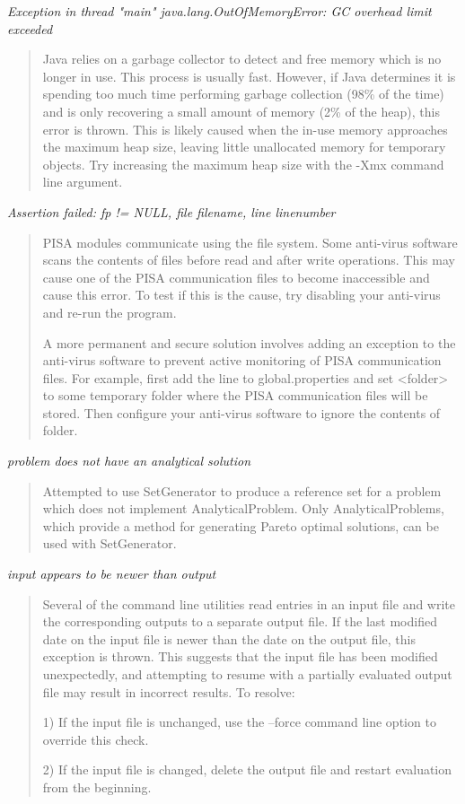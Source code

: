\noindent
\textit{Exception in thread "main" java.lang.OutOfMemoryError: GC overhead limit exceeded}
\begin{quote}
  Java relies on a garbage collector to detect and free memory which is no longer in use.  This process is usually fast.  However, if Java determines it is spending too much time performing garbage collection (98\% of the time) and is only recovering a small amount of memory (2\% of the heap), this error is thrown.  This is likely caused when the in-use memory approaches the maximum heap size, leaving little unallocated memory for temporary objects.  Try  increasing the maximum heap size with the -Xmx command line argument.
\end{quote}

\noindent
\textit{Assertion failed: fp != NULL, file \<filename\>, line \<linenumber\>}
\begin{quote}
  PISA modules communicate using the file system.  Some anti-virus software scans the contents of files before read and after write operations.  This may cause one of the PISA communication files to become inaccessible and cause this error.  To test if this is the cause, try disabling your anti-virus and re-run the program.
  
  A more permanent and secure solution involves adding an exception to the  anti-virus software to prevent active monitoring of PISA communication files. For example, first add the line
  to global.properties and set <folder> to some temporary folder where the PISA communication files will be stored.  Then configure your anti-virus software to ignore the contents of \<folder\>.
\end{quote}

\noindent
\textit{problem does not have an analytical solution}
\begin{quote}
  Attempted to use SetGenerator to produce a reference set for a problem which does not implement AnalyticalProblem.  Only AnalyticalProblems, which provide a method for generating Pareto optimal solutions, can be used with SetGenerator.
\end{quote}

\noindent
\textit{input appears to be newer than output}
\begin{quote}
  Several of the command line utilities read entries in an input file and write the corresponding outputs to a separate output file.  If the last modified date on the input file is newer than the date on the output file, this exception is thrown.  This suggests that the input file has been modified unexpectedly, and attempting to resume with a partially evaluated output file may result in incorrect results.  To resolve:
  
    1) If the input file is unchanged, use the --force command line option to override this check.
       
    2) If the input file is changed, delete the output file and restart evaluation from the beginning.
\end{quote}

